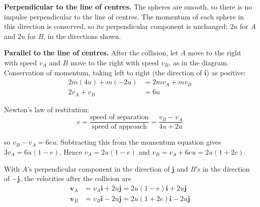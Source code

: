 \documentclass[leqno]{article}
\begin{document}
\begin{enumerate}[
  label=\textbf{\arabic*.},
  leftmargin=*,
  topsep=0pt,
  partopsep=0pt,
  parsep=0pt
]
\begin{djsSolution}
\begin{enumerate}[label=\textbf{(\alph*)}, start=1]

\textbf{Perpendicular to the line of centres.} The spheres are smooth, so there is no impulse perpendicular to the line of centres. The momentum of each sphere in this direction is conserved, so its perpendicular component is unchanged: \(2u\) for \(A\) and \(2u\) for \(B\), in the directions shown.

\textbf{Parallel to the line of centres.} After the collision, let \(A\) move to the right with speed \(v_A\) and \(B\) move to the right with speed \(v_B\), as in the diagram. Conservation of momentum, taking left to right (the direction of \(\mathbf{i}\)) as positive:
\begin{align*}
2m(4u)+m(-2u)&=2mv_A+mv_B\\
2v_A+v_B&=6u
\end{align*}

Newton's law of restitution:
\[
e=\frac{\text{speed of separation}}{\text{speed of approach}}=\frac{v_B-v_A}{4u+2u}
\]

so \(v_B-v_A=6eu\). Subtracting this from the momentum equation gives \(3v_A=6u(1-e)\). Hence \(v_A=2u(1-e)\) and \(v_B=v_A+6eu=2u(1+2e)\).

With \(A\)'s perpendicular component in the direction of \(\mathbf{j}\) and \(B\)'s in the direction of \(-\mathbf{j}\), the velocities after the collision are
\begin{align*}
\mathbf{v}_A&=v_A\mathbf{i}+2u\mathbf{j}=2u(1-e)\mathbf{i}+2u\mathbf{j}\\
\mathbf{v}_B&=v_B\mathbf{i}-2u\mathbf{j}=2u(1+2e)\mathbf{i}-2u\mathbf{j}
\end{align*}


\end{enumerate}
\end{djsSolution}
\end{enumerate}
\end{document}
